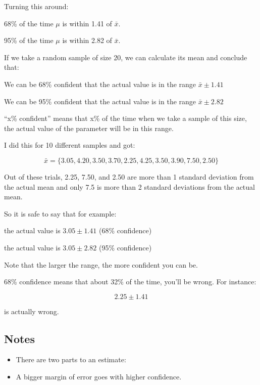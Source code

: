 \documentclass[landscape]{exam}
\begin{document}
  Turning this around:
  \begin{itemize*}
    \item 68\% of the time $\mu$ is within 1.41 of $\bar{x}$.
    \item 95\% of the time $\mu$ is within 2.82 of $\bar{x}$.
  \end{itemize*}

  If we take a random sample of size 20, we can calculate its mean and conclude
  that:
  \begin{itemize*}
    \item We can be 68\% confident that the actual value is in the range
      $\bar{x} \pm 1.41$
    \item We can be 95\% confident that the actual value is in the range
      $\bar{x} \pm 2.82$
  \end{itemize*}

  ``x\% confident'' means that x\% of the time when we take a sample of this
  size, the actual value of the parameter will be in this range.

  I did this for 10 different samples and got:

  \[
    \bar{x} = \{ 3.05, 4.20, 3.50, 3.70, 2.25, 4.25, 3.50, 3.90, 7.50, 2.50 \}
  \]

  Out of these trials, 2.25, 7.50, and 2.50 are more than 1 standard deviation
  from the actual mean and only 7.5 is more than 2 standard deviations from the
  actual mean.

  So it is safe to say that for example:
  \begin{itemize*}
    \item the actual value is $3.05 \pm 1.41$ (68\% confidence)
    \item the actual value is $3.05 \pm 2.82$ (95\% confidence)
  \end{itemize*}

  Note that the larger the range, the more confident you can be. 
  
  68\% confidence means that about 32\% of the time, you'll be wrong. For
  instance:

  \[
    2.25 \pm 1.41
  \] 

  is actually wrong.

  \subsection{Notes}

  \begin{itemize}
    \item There are two parts to an estimate:

    \item A bigger margin of error goes with higher confidence.

  \end{itemize}
\end{document}
